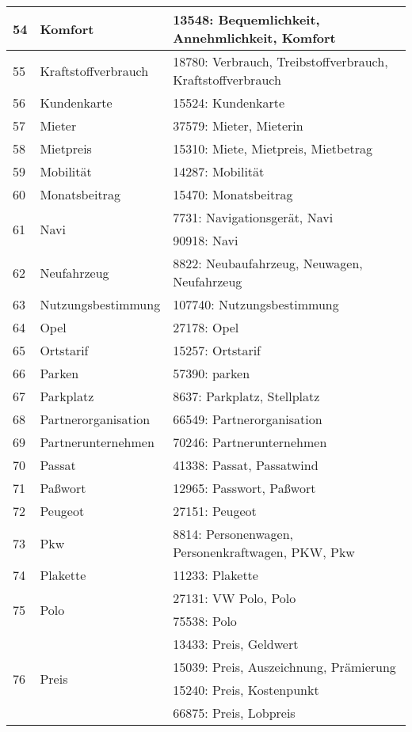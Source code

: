 \begin{longtable}{|m{1cm}|m{4.5cm}|m{7.5cm}|}
	\hline
	54 & Komfort & 13548: Bequemlichkeit, Annehmlichkeit, Komfort\\
	\hline
	55 & Kraftstoffverbrauch & 18780: Verbrauch, Treibstoffverbrauch, Kraftstoffverbrauch\\
	\hline
	56 & Kundenkarte & 15524: Kundenkarte\\
	\hline
	57 & Mieter & 37579: Mieter, Mieterin\\
	\hline
	58 & Mietpreis & 15310: Miete, Mietpreis, Mietbetrag\\
	\hline
	59 & Mobilität & 14287: Mobilität\\
	\hline
	60 & Monatsbeitrag & 15470: Monatsbeitrag\\
	\hline
	\multirow{2}{*}{61} & \multirow{2}{*}{Navi} & 7731: Navigationsgerät, Navi\\
	& & 90918: Navi\\
	\hline
	62 & Neufahrzeug & 8822: Neubaufahrzeug, Neuwagen, Neufahrzeug\\
	\hline
	63 & Nutzungsbestimmung & 107740: Nutzungsbestimmung\\
	\hline
	64 & Opel & 27178: Opel\\
	\hline
	65 & Ortstarif & 15257: Ortstarif\\
	\hline
	66 & Parken & 57390: parken\\
	\hline
	67 & Parkplatz & 8637: Parkplatz, Stellplatz\\
	\hline
	68 & Partnerorganisation & 66549: Partnerorganisation\\
	\hline
	69 & Partnerunternehmen & 70246: Partnerunternehmen\\
	\hline
	70 & Passat & 41338: Passat, Passatwind\\
	\hline
	71 & Paßwort & 12965: Passwort, Paßwort\\
	\hline
	72 & Peugeot & 27151: Peugeot\\
	\hline
	73 & Pkw & 8814: Personenwagen, Personenkraftwagen, PKW, Pkw\\
	\hline
	74 & Plakette & 11233: Plakette\\
	\hline
	\multirow{2}{*}{75} & \multirow{2}{*}{Polo} & 27131: VW Polo, Polo\\
	& & 75538: Polo\\
	\hline
	\multirow{4}{*}{76} & \multirow{4}{*}{Preis} & 13433: Preis, Geldwert\\
	& & 15039: Preis, Auszeichnung, Prämierung\\
	\hline
	& & 15240: Preis, Kostenpunkt\\
	\hline
	& & 66875: Preis, Lobpreis\\

\end{longtable}
